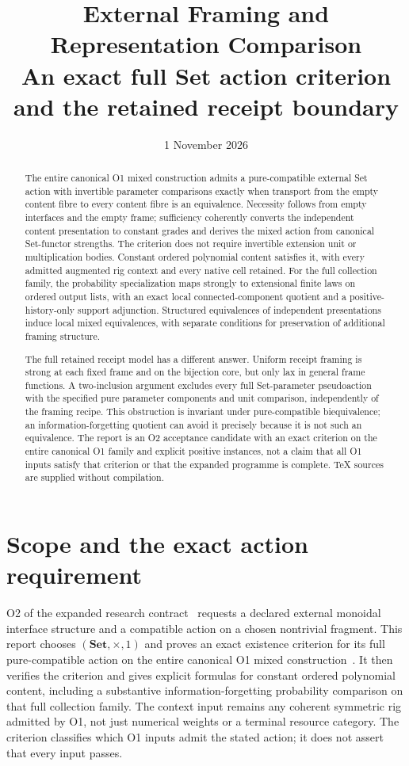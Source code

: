 \documentclass[11pt,a4paper]{article}
\title{External Framing and Representation Comparison\\[5pt]
\large An exact full Set action criterion and the retained receipt boundary}
\author{}
\date{1 November 2026}
\theoremstyle{definition}
\newcommand{\Set}{\mathbf{Set}}
\begin{document}
\maketitle
\begin{abstract}
The entire canonical O1 mixed construction admits a pure-compatible external
Set action with invertible parameter comparisons exactly when transport from
the empty content fibre to every content fibre is an equivalence.
Necessity follows from empty interfaces and the empty frame; sufficiency
coherently converts the independent content presentation to constant grades
and derives the mixed action from canonical Set-functor strengths.
The criterion does not require invertible extension unit or multiplication
bodies. Constant ordered polynomial content satisfies it, with every admitted
augmented rig context and every native cell retained. For the full
collection family, the probability specialization maps strongly to extensional
finite laws on ordered output lists, with an exact local connected-component
quotient and a positive-history-only support adjunction.
Structured equivalences of independent presentations
induce local mixed equivalences, with separate conditions for preservation
of additional framing structure.

The full retained receipt model has a different answer. Uniform receipt
framing is strong at each fixed frame and on the bijection core, but only lax
in general frame functions. A two-inclusion argument excludes every
full Set-parameter pseudoaction with the specified pure parameter components
and unit comparison, independently of the framing recipe. This obstruction
is invariant under pure-compatible biequivalence; an information-forgetting
quotient can avoid it precisely because it is not such an equivalence.
The report is an O2 acceptance candidate with an exact criterion on the
entire canonical O1 family and explicit positive instances, not a claim that
all O1 inputs satisfy that criterion or that the expanded programme is
complete. TeX sources are supplied without compilation.
\end{abstract}
\tableofcontents

\section{Scope and the exact action requirement}\label{sec:scope}

O2 of the expanded research contract~\cite{Contract} requests a declared
external monoidal interface structure and a compatible action on a chosen
nontrivial fragment. This report chooses $(\Set,\times,1)$ and proves an
exact existence criterion for its full pure-compatible action on the entire
canonical O1 mixed construction~\cite{O1}. It then verifies the criterion
and gives explicit formulas for constant ordered polynomial content, including
a substantive information-forgetting probability comparison on that full
collection family. The context input remains any coherent symmetric rig
admitted by O1, not just numerical weights or a terminal resource category.
The criterion classifies which O1 inputs admit the stated action; it does
not assert that every input passes.
\end{document}
